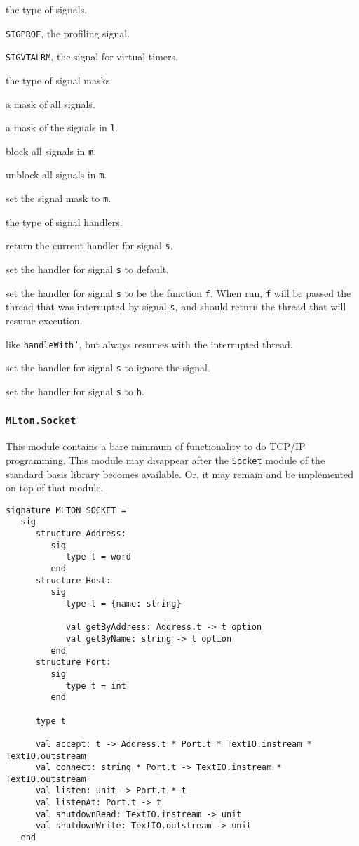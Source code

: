 \begin{description}

 the type of signals.

{\tt SIGPROF}, the profiling signal.

{\tt SIGVTALRM}, the signal for virtual timers.

 the type of signal masks.

 a mask of all signals.

 a mask of the signals in {\tt l}.

 block all signals in {\tt m}.

 unblock all signals in {\tt m}.

 set the signal mask to {\tt m}.

 the type of signal handlers.

 return the current handler for signal {\tt s}.

 set the handler for signal {\tt s} to default.

 set the handler for signal {\tt s} to be the
function {\tt f}.  When run, {\tt f} will be passed the thread that was
interrupted by signal {\tt s}, and should return the thread that will resume
execution.

 like {\tt handleWith'}, but always resumes with the
interrupted thread.

 set the handler for signal {\tt s} to ignore the signal.

 set the handler for signal {\tt s} to {\tt h}.
\end{description}

\subsubsection{{\tt MLton.Socket}}
This module contains a bare minimum of functionality to do TCP/IP programming.
This module may disappear after the {\tt Socket} module of the standard basis
library becomes available.  Or, it may remain and be implemented on top of that
module. 
\begin{verbatim}
signature MLTON_SOCKET =
   sig
      structure Address:
         sig
            type t = word
         end
      structure Host:
         sig
            type t = {name: string}

            val getByAddress: Address.t -> t option
            val getByName: string -> t option
         end
      structure Port:
         sig
            type t = int
         end

      type t

      val accept: t -> Address.t * Port.t * TextIO.instream * TextIO.outstream
      val connect: string * Port.t -> TextIO.instream * TextIO.outstream
      val listen: unit -> Port.t * t
      val listenAt: Port.t -> t
      val shutdownRead: TextIO.instream -> unit
      val shutdownWrite: TextIO.outstream -> unit
   end
\end{verbatim}

